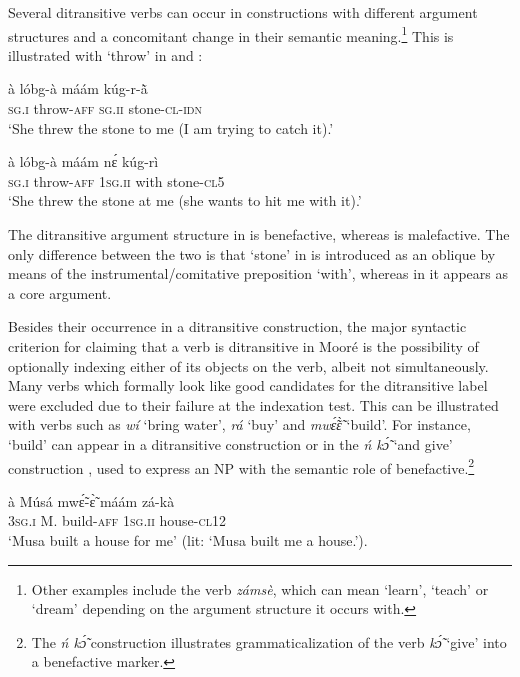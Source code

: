 \documentclass[output=paper]{langsci/langscibook}
\begin{document}
Several ditransitive verbs can occur in constructions with different argument structures and a concomitant change in their semantic meaning.\footnote{Other examples include the verb \textit{zámsè}, which can mean `learn', `teach' or `dream' depending on the argument structure it occurs with.} This is illustrated with `throw' in  and :  

\ea
\label{ex:3.pacchiarotti}
\gll à    lóbg-à    máám    kúg-r-\`{ã}\\
\textsc{sg.i}  throw-\textsc{aff}  \textsc{sg.ii}  stone-\textsc{cl-idn} \\
\glt `She threw the stone to me (I am trying to catch it).'  
\z

\ea
\label{ex:4.pacchiarotti}
\gll à    lóbg-à    máám    nɛ́  kúg-rì \\
\textsc{sg.i}    throw-\textsc{aff}  \textsc{1sg.ii}    with  stone-\textsc{cl5} \\
\glt `She threw the stone at me (she wants to hit me with it).'
\z

The ditransitive argument structure in  is benefactive, whereas  is malefactive. The only difference between the two is that `stone' in  is introduced as an oblique by means of the instrumental/comitative preposition `with', whereas in  it appears as a core argument. 

Besides their occurrence in a ditransitive construction, the major syntactic criterion for claiming that a verb is ditransitive in Mooré is the possibility of optionally indexing either of its objects on the verb, albeit not simultaneously. Many verbs which formally look like good candidates for the ditransitive label were excluded due to their failure at the indexation test. This can be illustrated with verbs such as \textit{wí} `bring water', \textit{rá} `buy' and \textit{mw\'{\~{ɛ}}\`{\~{ɛ}}} `build'. For instance, `build' can appear in a ditransitive construction  or in the \textit{ń k\'{\~{ɔ}}} `and give' construction , used to express an NP with the semantic role of benefactive.\footnote{The\textit{ ń k\'{\~{ɔ}}} construction illustrates grammaticalization of the verb \textit{k\'{\~{ɔ}}} `give' into a benefactive marker.} 

\ea
\label{ex:5.pacchiarotti}
\gll à    Músá  mwɛ̃́-ɛ̃̀    máám    zá-kà \\
\textsc{3sg.i}    M.  build-\textsc{aff}  \textsc{1sg.ii}    house-\textsc{cl12} \\
\glt `Musa built a house for me' (lit: `Musa built me a house.'). 
\z
\end{document}
